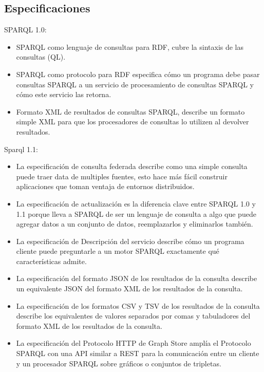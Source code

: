 \documentclass[conference]{IEEEtran}
\begin{document}
\subsection{Especificaciones}

SPARQL 1.0:

\begin{itemize}
	\item SPARQL como lenguaje de consultas para RDF, cubre la sintaxis de las consultas (QL).
	\item SPARQL como protocolo para RDF especifica cómo un programa debe pasar consultas SPARQL a un servicio de procesamiento de consultas SPARQL y cómo este servicio las retorna. 
	\item Formato XML de resultados de consultas SPARQL, describe un formato simple XML para que los procesadores de consultas lo utilizen al devolver resultados.
	
\end{itemize}

Sparql 1.1: 

\begin{itemize}
	\item La especificación de consulta federada describe como una simple consulta puede traer data de multiples fuentes, esto hace más fácil construir aplicaciones que toman ventaja de entornos distribuidos.
	\item La especificación de actualización es la diferencia clave entre SPARQL 1.0 y 1.1 porque lleva a SPARQL de ser un lenguaje de consulta a algo que puede agregar datos a un conjunto de datos, reemplazarlos y eliminarlos también.
	\item La especificación de Descripción del servicio describe cómo un programa cliente puede preguntarle a un motor SPARQL exactamente qué características admite.
	\item La especificación del formato JSON de los resultados de la consulta describe un equivalente JSON del formato XML de los resultados de la consulta.
	\item La especificación de los formatos CSV y TSV de los resultados de la consulta describe los equivalentes de valores separados por comas y tabuladores del formato XML de los resultados de la consulta.
	\item La especificación del Protocolo HTTP de Graph Store amplía el Protocolo SPARQL con una API similar a REST para la comunicación entre un cliente y un procesador SPARQL sobre gráficos o conjuntos de tripletas. 
	
\end{itemize}
\end{document}
